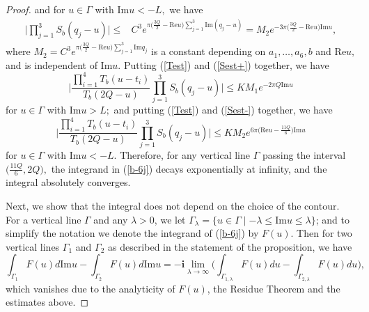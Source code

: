 \documentclass[11pt]{article}
\theoremstyle{remark}
\theoremstyle{remark}
\numberwithin{equation}{section}
\begin{document}
\begin{proof}
and for $u\in\Gamma$ with $\mathrm{Im}u <-L,$ we have 
\begin{equation}\label{Sest-}
\begin{split}
\Bigg|\prod_{j=1}^3 S_b(q_j-u)\Bigg|   \leqslant & C^3e^{\pi \big(\frac{3Q}{2}-\mathrm{Re}u\big)\sum_{j=1}^3\mathrm{Im}(q_j-u)}= M_2e^{-3\pi \big(\frac{3Q}{2}-\mathrm{Re}u\big)\mathrm{Im}u},
\end{split}
\end{equation}
where $M_2=C^3e^{\pi\big(\frac{3Q}{2}-\mathrm{Re}u\big)\sum_{j=1}^3\mathrm{Im}q_j}$  is a constant depending on $a_1,\dots, a_6, b$  and $\mathrm{Re}u,$ and is independent of $\mathrm{Im}u.$ Putting (\ref{Test}) and (\ref{Sest+}) together, we have
\begin{equation}\label{+bound}
    \Bigg|\frac{\prod_{i=1}^4 T_b(u-t_i)}{T_b(2Q-u)}\prod_{j=1}^3 S_b(q_j-u)\Bigg|\leqslant KM_1 e^{-2\pi Q\mathrm{Im}u}
\end{equation}
for $u\in \Gamma$ with $\mathrm{Im}u>L;$
and putting (\ref{Test}) and (\ref{Sest-}) together, we have
\begin{equation}\label{-bound}
    \Bigg|\frac{\prod_{i=1}^4 T_b(u-t_i)}{T_b(2Q-u)}\prod_{j=1}^3 S_b(q_j-u)\Bigg|\leqslant KM_2e^{6\pi \big(\mathrm{Re}u-\frac{11Q}{6}\big)\mathrm{Im}u}
\end{equation}
for $u\in \Gamma$ with $\mathrm{Im}u<-L.$
Therefore, for any vertical line $\Gamma$ passing the interval $\big(\frac{11Q}{6},2Q\big),$ the integrand in (\ref{b-6j}) decays exponentially at infinity, and the integral absolutely converges. 

Next, we show that the integral does not depend on the choice of the contour. For a vertical line $\Gamma$ and any $\lambda>0$, we let $\Gamma_\lambda=\{u\in \Gamma\mid -\lambda\leqslant \mathrm{Im}u\leqslant \lambda\}$; and to simplify the notation we denote the integrand of (\ref{b-6j}) by $F(u)$. Then for two vertical lines   $\Gamma_1$ and $\Gamma_2$ as described in the statement of the proposition, we have
$$\int_{\Gamma_1}F(u)d\mathrm{Im}u-\int_{\Gamma_2}F(u)d\mathrm{Im}u=-\mathbf i\lim_{\lambda\to\infty}\bigg(\int_{\Gamma_{1,\lambda}}F(u)du-\int_{\Gamma_{2,\lambda}}F(u)du\bigg),$$
which vanishes due to the analyticity of $F(u)$, the Residue Theorem and the estimates above.
\end{proof}
\end{document}
